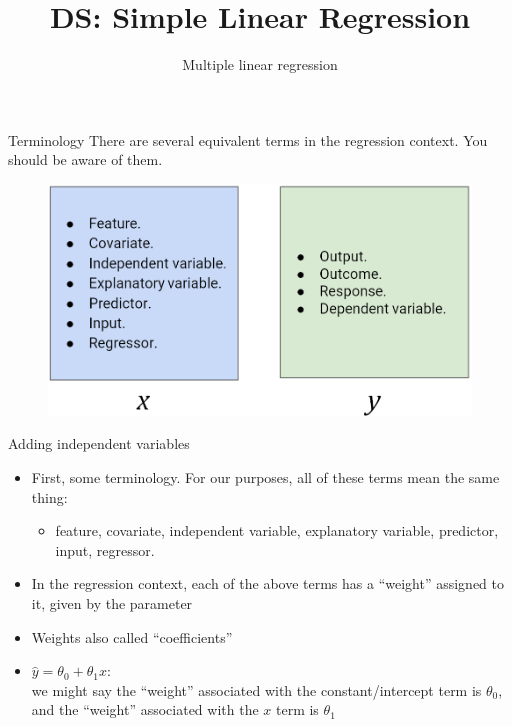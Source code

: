 \documentclass[aspectratio=169]{../latex_main/tntbeamer}  %
\title[Regression]{DS: Simple Linear Regression}
\subtitle{Multiple linear regression}
\begin{document}
	
	\maketitle
	\begin{frame}{Terminology}
	    There are several equivalent terms in the regression context. You should be aware of them.\\
	    \begin{figure}
	        \centering
	        \includegraphics[scale=.42]{Bild9}
	    \end{figure}
        
	\end{frame}
	
	
	
	\begin{frame}{Adding independent variables}
	    
	    \begin{itemize}
	        \item First, some terminology. For our purposes, all of these terms mean the same thing:
    	    \begin{itemize}
    	        \item feature, covariate, independent variable, explanatory variable, predictor, input, regressor.
    	    \end{itemize}
    	    \item In the regression context, each of the above terms has a ``weight'' assigned to it, given by the parameter
    	    \item Weights also called ``coefficients''
    	    \item $\hat{y} = \theta_0 + \theta_1x$:\\
    	    we might say the “weight” associated with the constant/intercept term is $\theta_0$,\\ and the “weight” associated with the $x$ term is $\theta_1$ 
	    \end{itemize}
	    
	\end{frame}
	
\end{document}
